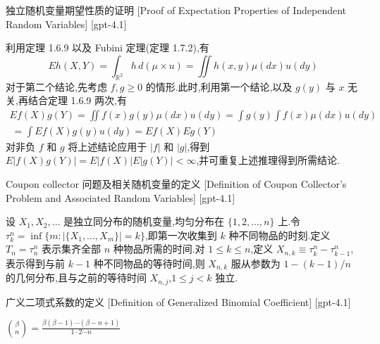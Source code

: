 \documentclass[UTF8]{ctexart}
\begin{document}
    \begin{prf}
        {独立随机变量期望性质的证明}
        [Proof of Expectation Properties of Independent Random Variables]
        [gpt-4.1]
        
利用定理 1.6.9 以及 Fubini 定理(定理 1.7.2),有
\[
E h(X, Y) = \int_{\mathbb{R}^{2}} h \, d(\mu \times 
u) = \iint h(x, y) \mu(dx) 
u(dy)
\]
对于第二个结论,先考虑 $f, g \ge 0$ 的情形.此时,利用第一个结论,以及 $g(y)$ 与 $x$ 无关,再结合定理 1.6.9 两次,有
\[
\begin{array}{l}
{\displaystyle E f(X) g(Y) = \iint f(x) g(y) \mu(dx) 
u(dy) = \int g(y) \int f(x) \mu(dx) 
u(dy)} \\
{\displaystyle ~ = \int E f(X) g(y) 
u(dy) = E f(X) E g(Y)}
\end{array}
\]
对非负 $f$ 和 $g$ 将上述结论应用于 $|f|$ 和 $|g|$,得到 $E|f(X) g(Y)| = E|f(X)| E|g(Y)| < \infty$,并可重复上述推理得到所需结论.

    \end{prf}
    
    
    
    \begin{dfn}
        {Coupon collector 问题及相关随机变量的定义}
        [Definition of Coupon Collector's Problem and Associated Random Variables]
        [gpt-4.1]
        
设 $X_1, X_2, \ldots$ 是独立同分布的随机变量,均匀分布在 $\{1, 2, \ldots, n\}$ 上.令 $\tau_k^n = \operatorname*{inf} \{ m : | \{ X_1, \dots, X_m \} | = k \}$,即第一次收集到 $k$ 种不同物品的时刻.定义 $T_n = \tau_n^n$ 表示集齐全部 $n$ 种物品所需的时间.对 $1 \leq k \leq n$,定义 $X_{n, k} \equiv \tau_k^n - \tau_{k-1}^n$,表示得到与前 $k-1$ 种不同物品的等待时间,则 $X_{n, k}$ 服从参数为 $1 - (k-1)/n$ 的几何分布,且与之前的等待时间 $X_{n, j}$,$1 \leq j < k$ 独立.

    \end{dfn}
    
    
    
    \begin{dfn}
        {广义二项式系数的定义}
        [Definition of Generalized Binomial Coefficient]
        [gpt-4.1]
        
${\binom { \beta } { n }} = \frac { \beta ( \beta - 1 ) \cdots ( \beta - n + 1 ) } { 1 \cdot 2 \cdots n }$

    \end{dfn}
    
\end{document}

